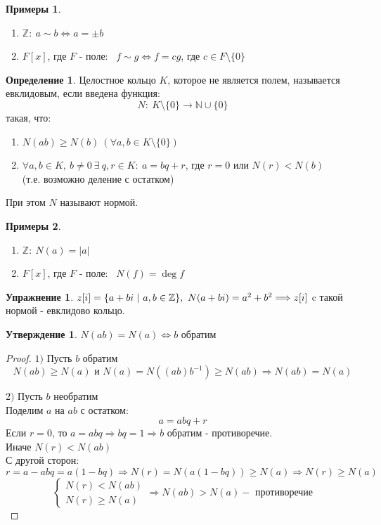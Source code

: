 \documentclass[a4paper, 12pt]{article}
\newcommand{\Z}{\mathbb Z}
\newcommand{\N}{\mathbb N}
\newcommand\tab[1][.5cm]{\hspace*{#1}}
\theoremstyle{definition}
\newtheorem*{definition}{Определение}
\newtheorem*{subtheorem}{Утверждение}
\newtheorem*{example}{Примеры}
\newtheorem*{Exercise}{Упражнение}
\begin{document}
  \begin{example}\tab
    \begin{enumerate}
      \item $\Z: \ a \sim b \Longleftrightarrow a= \pm  b$
      \item $F[x]$, где $F$ - поле: \ 
      $f\sim g \Longleftrightarrow f = cg$, где $c \in F \setminus \{0\}$
    \end{enumerate}
  \end{example}
  \begin{definition}
    Целостное кольцо $K$, которое не является полем, называется евклидовым, если введена функция:
    $$N: \ K\setminus \{0\} \to \N \cup \{0\}$$
    такая, что:
    \begin{enumerate}
      \item $N(ab)\geq N(b) \ (\forall a, b \in K\setminus \{0\})$
      \item $\forall a, b \in K, \ b\neq 0 \ \exists \ q, r \in K :  \ a = bq+r$, где $r=0$ или $N(r)<N(b)$ \\
      (т.е. возможно деление с остатком)   
    \end{enumerate}
    При этом $N$ называют нормой.  
  \end{definition}
  \begin{example}\tab
    \begin{enumerate}
      \item $\Z: \  N(a) = |a|$
      \item $F[x]$, где $F$ - поле: \ $N(f) = \deg f$   
    \end{enumerate}
  \end{example}
  \begin{Exercise}
    $z[i] = \{a+bi \ | \ a, b \in \Z\}, \ N(a + bi) = a^2 + b^2 \Longrightarrow \\
    z[i]$ c такой нормой - евклидово кольцо. 
  \end{Exercise}
  \begin{subtheorem}
    $N(ab) = N(a) \Longleftrightarrow b$ обратим 
  \end{subtheorem}
  \begin{proof}\tab
    \item[$1)$] Пусть $b$ обратим
    $$N(ab) \geq N(a) \text{ и } N(a) = N((ab)b^{-1}) \geq N(ab) \Longrightarrow N(ab) = N(a)$$
    \item[$2)$] Пусть $b$ необратим\\
    Поделим $a$ на $ab$ с остатком: 
    $$a = abq + r$$
    Если $r =0$, то $a = abq \Longrightarrow bq = 1 \Longrightarrow b$ обратим - противоречие.\\
    Иначе $N(r)<N(ab)$\\
    С другой сторон: $$r = a - abq = a(1-bq) \Longrightarrow N(r) = N(a(1-bq)) \geq N(a) \Longrightarrow N(r) \geq N(a)$$
    $$\begin{cases}
      N(r)<N(ab) \\
      N(r) \geq N(a)
    \end{cases} \Longrightarrow N(ab) > N(a) - \text{ противоречие}$$
  \end{proof}
\end{document}
